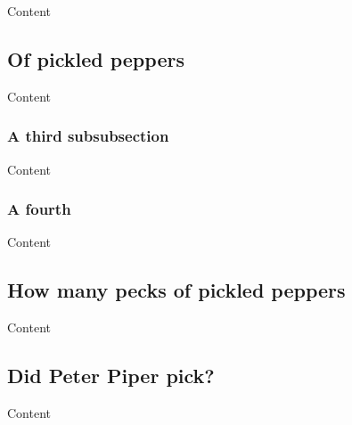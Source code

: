 \documentclass{article}
\begin{document}
Content

\subsection{Of pickled peppers}

Content

\subsubsection{A third subsubsection}

Content

\subsubsection{A fourth}

Content

\subsection[How many pecks]{How many pecks of pickled peppers}

Content

\subsection{Did Peter Piper pick?}

Content
\end{document}
